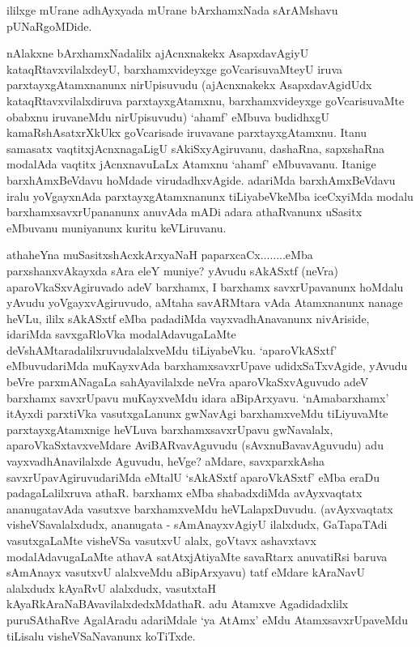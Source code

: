 \centerline{ililxge mUrane adhAyxyada mUrane bArxhamxNada sArAMshavu pUNaRgoMDide.}


\begin{artha}
nAlakxne bArxhamxNadalilx ajAcnxnakekx AsapxdavAgiyU kataqRtavxvilalxdeyU, barxhamxvideyxge goVcarisuvaMteyU iruva parxtayxgAtamxnanunx nirUpisuvudu \mdash  (ajAcnxnakekx AsapxdavAgidUdx kataqRtavxvilalxdiruva parxtayxgAtamxnu, barxhamxvideyxge goVcarisuvaMte obabxnu iruvaneMdu nirUpisuvudu) `ahamf' eMbuva budidhxgU kamaRshAsatxrXkUkx  goVcarisade iruvavane parxtayxgAtamxnu. Itanu samasatx vaqtitxjAcnxnagaLigU sAkiSxyAgiruvanu, dashaRna, sapxshaRna modalAda vaqtitx jAcnxnavuLaLx Atamxnu `ahamf' eMbuvavanu. Itanige barxhAmxBeVdavu hoMdade virudadhxvAgide. adariMda barxhAmxBeVdavu iralu yoVgayxnAda parxtayxgAtamxnanunx tiLiyabeVkeMba iceCxyiMda modalu barxhamxsavxrUpananunx anuvAda mADi adara athaRvanunx uSasitx eMbuvanu muniyanunx kuritu keVLiruvanu.
\end{artha}


\begin{artha}
athaheYna muSasitxshAcxkArxyaNaH paparxcaCx........eMba parxshanxvAkayxda sAra \ndash eleY muniye? yAvudu sAkASxtf (neVra) aparoVkaSxvAgiruvado adeV barxhamx, I barxhamx savxrUpavanunx hoMdalu yAvudu yoVgayxvAgiruvudo, aMtaha savARMtara vAda Atamxnanunx nanage heVLu, ililx sAkASxtf eMba padadiMda vayxvadhAnavanunx nivAriside, idariMda savxgaRloVka modalAdavugaLaMte deVshAMtaradalilxruvudalalxveMdu tiLiyabeVku. `aparoVkASxtf' eMbuvudariMda muKayxvAda barxhamxsavxrUpave udidxSaTxvAgide, yAvudu beVre parxmANagaLa sahAyavilalxde neVra aparoVkaSxvAguvudo adeV barxhamx savxrUpavu muKayxveMdu idara aBipArxyavu. `nAmabarxhamx' itAyxdi parxtiVka vasutxgaLanunx gwNavAgi barxhamxveMdu tiLiyuvaMte parxtayxgAtamxnige heVLuva barxhamxsavxrUpavu gwNavalalx, aparoVkaSxtavxveMdare AviBARvavAguvudu (sAvxnuBavavAguvudu) adu vayxvadhAnavilalxde Aguvudu, heVge? aMdare, savxparxkAsha savxrUpavAgiruvudariMda eMtalU `sAkASxtf aparoVkASxtf' eMba eraDu padagaLalilxruva athaR. barxhamx eMba shabadxdiMda avAyxvaqtatx ananugatavAda vasutxve barxhamxveMdu heVLalapxDuvudu. (avAyxvaqtatx visheVSavalalxdudx, ananugata - sAmAnayxvAgiyU ilalxdudx, GaTapaTAdi vasutxgaLaMte visheVSa vasutxvU alalx, goVtavx ashavxtavx modalAdavugaLaMte athavA satAtxjAtiyaMte savaRtarx anuvatiRsi baruva sAmAnayx vasutxvU alalxveMdu aBipArxyavu) tatf eMdare kAraNavU alalxdudx kAyaRvU alalxdudx, vasutxtaH kAyaRkAraNaBAvavilalxdedxMdathaR. adu Atamxve Agadidadxlilx puruSAthaRve AgalAradu adariMdale `ya AtAmx' eMdu AtamxsavxrUpaveMdu tiLisalu visheVSaNavanunx koTiTxde.
\end{artha}


